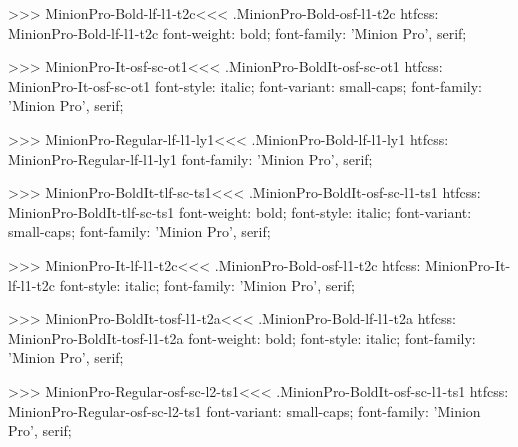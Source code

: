 {>>>
\<MinionPro-Bold-lf-l1-t2c\><<<
.MinionPro-Bold-osf-l1-t2c
htfcss:  MinionPro-Bold-lf-l1-t2c  font-weight: bold; font-family: 'Minion Pro', serif;

>>>
\<MinionPro-It-osf-sc-ot1\><<<
.MinionPro-BoldIt-osf-sc-ot1
htfcss:  MinionPro-It-osf-sc-ot1  font-style: italic; font-variant: small-caps; font-family: 'Minion Pro', serif;

>>>
\<MinionPro-Regular-lf-l1-ly1\><<<
.MinionPro-Bold-lf-l1-ly1
htfcss:  MinionPro-Regular-lf-l1-ly1  font-family: 'Minion Pro', serif;

>>>
\<MinionPro-BoldIt-tlf-sc-ts1\><<<
.MinionPro-BoldIt-osf-sc-l1-ts1
htfcss:  MinionPro-BoldIt-tlf-sc-ts1  font-weight: bold; font-style: italic; font-variant: small-caps; font-family: 'Minion Pro', serif;

>>>
\<MinionPro-It-lf-l1-t2c\><<<
.MinionPro-Bold-osf-l1-t2c
htfcss:  MinionPro-It-lf-l1-t2c  font-style: italic; font-family: 'Minion Pro', serif;

>>>
\<MinionPro-BoldIt-tosf-l1-t2a\><<<
.MinionPro-Bold-lf-l1-t2a
htfcss:  MinionPro-BoldIt-tosf-l1-t2a  font-weight: bold; font-style: italic; font-family: 'Minion Pro', serif;

>>>
\<MinionPro-Regular-osf-sc-l2-ts1\><<<
.MinionPro-BoldIt-osf-sc-l1-ts1
htfcss:  MinionPro-Regular-osf-sc-l2-ts1  font-variant: small-caps; font-family: 'Minion Pro', serif;

}
